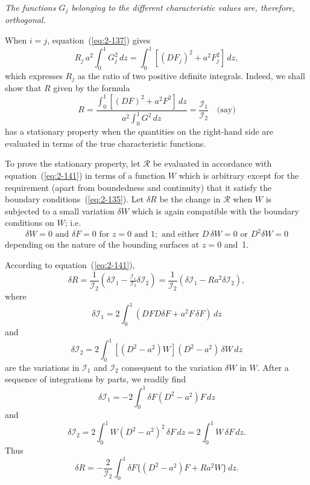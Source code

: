 \emph{The functions $G_j$ belonging to the different characteristic values are, therefore,
orthogonal.}

When $i = j$, equation~(\ref{eq:2-137}) gives
\begin{equation}
\label{eq:2-140}
R_j\,a^2\!\int_0^1 G_j^2\,dz = \int_0^1[(DF_j)^2+a^2 F_j^2]\,dz,
\end{equation}
which expresses $R_j$ as the ratio of two positive definite integrals. Indeed, we shall show that $R$ given by the formula
\begin{equation}
\label{eq:2-141}
R = \frac{\displaystyle\int_0^1[(DF)^2+a^2 F^2]\,dz}{a^2\!\displaystyle\int_0^1 G^2\,dz} = \frac{\mathscr{I}_1}{\mathscr{I}_2} \quad\text{(say)}
\end{equation}
has a stationary property when the quantities on the right-hand side
are evaluated in terms of the true characteristic functions.

To prove the stationary property, let $\mathscr{R}$ be evaluated in accordance
with equation~(\ref{eq:2-141}) in terms of a function $W$ which is arbitrary except
for the requirement (apart from boundedness and continuity) that it
satisfy the boundary conditions~(\ref{eq:2-135}). Let $\delta R$ be the change in $\mathscr{R}$ when
$W$ is subjected to a small variation $\delta W$ which is again compatible with the
boundary conditions on $W$; i.e.
\begin{equation}
\label{eq:2-142}
\delta W = 0 \text{ and } \delta F = 0 \text{ for } z = 0 \text{ and } 1;\text{ and either } D\,\delta W = 0 \text{ or } D^2\delta W = 0
\end{equation}
depending on the nature of the bounding surfaces at $z = 0$ and~1.

According to equation~(\ref{eq:2-141}),
\begin{equation}
\label{eq:2-143}
\delta R = \frac{1}{\mathscr{I}_2}(\delta\mathscr{I}_1 - \tfrac{\mathscr{I}_1}{\mathscr{I}_2}\delta\mathscr{I}_2) = \frac{1}{\mathscr{I}_2}(\delta\mathscr{I}_1 - Ra^2\delta\mathscr{I}_2),
\end{equation}
where
\begin{equation}
\label{eq:2-144}
\delta\mathscr{I}_1 = 2\!\int_0^1(DFD\delta F + a^2 F\,\delta F)\,dz
\end{equation}
and
\begin{equation}
\label{eq:2-145}
\delta\mathscr{I}_2 = 2\!\int_0^1[(D^2-a^2)W](D^2-a^2)\,\delta W\,dz
\end{equation}
are the variations in $\mathscr{I}_1$ and $\mathscr{I}_2$ consequent to the variation $\delta W$ in $W$. After
a sequence of integrations by parts, we readily find
\begin{equation}
\label{eq:2-146}
\delta\mathscr{I}_1 = -2\!\int_0^1 \delta F(D^2-a^2)F\,dz
\end{equation}
and
\begin{equation}
\label{eq:2-147}
\delta\mathscr{I}_2 = 2\!\int_0^1 W(D^2-a^2)^2\,\delta F\,dz = 2\!\int_0^1 W\,\delta F\,dz.
\end{equation}
Thus
\begin{equation}
\label{eq:2-148}
\delta R = -\frac{2}{\mathscr{I}_2}\!\int_0^1 \delta F\{(D^2-a^2)F + Ra^2 W\}\,dz.
\end{equation}

